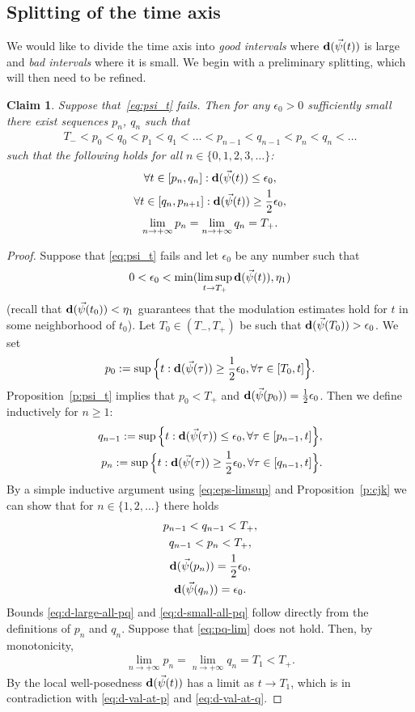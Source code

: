 \documentclass[10pt,reqno]{amsart}
\newcommand{\EQ}[1]{\begin{equation}\begin{split} #1 \end{split}\end{equation}}
\numberwithin{equation}{section}
\newtheorem{claim}[thm]{Claim}
\theoremstyle{remark}
\newcommand{\0}{\emptyset}
\newcommand{\eps}{\epsilon}
\newcommand{\bfd}{{\bf d}}
\begin{document}
\subsection{Splitting of the time axis}
We would like to divide the time axis into \emph{good intervals} where $\bfd(\vec\psi(t))$ is large
and \emph{bad intervals} where it is small.
We begin with a preliminary splitting, which will then need to be refined.
\begin{claim}\label{cl:pre-split}
Suppose that~\eqref{eq:psi_t} fails. Then for any $\eps_0 > 0$ sufficiently small there exist
sequences $p_n$, $q_n$ such that
\EQ{
T_- < p_0 < q_0 < p_1 < q_1 < \dots < p_{n-1} < q_{n-1} < p_n < q_n < \dots 
}
such that the following holds for all $n \in \{0, 1, 2, 3, \ldots\}$:
\begin{gather}
\forall t \in [p_n, q_n]: \bfd(\vec\psi(t)) \leq \eps_0, \label{eq:d-small-all-pq} \\
\forall t \in [q_n, p_{n+1}]: \bfd(\vec\psi(t)) \geq \frac 12\eps_0, \label{eq:d-large-all-pq} \\
\lim_{n \to +\infty}p_n = \lim_{n\to+\infty}q_n = T_+. \label{eq:pq-lim}
\end{gather}
\end{claim}
\begin{proof}
Suppose that \eqref{eq:psi_t} fails and let $\eps_0$ be any number such that
\EQ{\label{eq:eps-limsup}
0 < \eps_0 < \min(\limsup_{t\to T_+}\bfd(\vec\psi(t)), \eta_1)
}
(recall that $\bfd(\vec\psi(t_0)) < \eta_1$ guarantees that the modulation
estimates hold for $t$ in some neighborhood of $t_0$).
Let $T_0 \in (T_-, T_+)$ be such that $\bfd(\vec\psi(T_0)) > \eps_0$.
We set
\EQ{
p_0 := \sup\Big\{t: \bfd(\vec\psi(\tau)) \geq \frac 12 \eps_0, \forall \tau\in[T_0, t]\Big\}.
}
Proposition~\ref{p:psi_t} implies that $p_0 < T_+$ and $\bfd(\vec\psi(p_0)) = \frac 12 \eps_0$.
Then we define inductively for $n \geq 1$:
\begin{align}
q_{n-1} := \sup\Big\{t: \bfd(\vec\psi(\tau)) \leq \eps_0, \forall \tau\in[p_{n-1}, t]\Big\}, \\
p_n := \sup\Big\{t: \bfd(\vec\psi(\tau)) \geq \frac 12 \eps_0, \forall \tau\in[q_{n-1}, t]\Big\}.
\end{align}
By a simple inductive argument using \eqref{eq:eps-limsup} and Proposition~\ref{p:cjk}
we can show that for $n \in \{1, 2, \ldots\}$ there holds
\begin{gather}
p_{n-1} < q_{n-1} < T_+, \\
q_{n-1} < p_n < T_+, \\
\bfd(\vec\psi(p_n)) = \frac 12\eps_0, \label{eq:d-val-at-p} \\
\bfd(\vec\psi(q_n)) = \eps_0 \label{eq:d-val-at-q}.
\end{gather}
Bounds \eqref{eq:d-large-all-pq} and \eqref{eq:d-small-all-pq} follow directly from the definitions
of $p_n$ and $q_n$. Suppose that \eqref{eq:pq-lim} does not hold. Then, by monotonicity,
\EQ{
\lim_{n \to +\infty}p_n = \lim_{n\to+\infty}q_n = T_1 < T_+.
}
By the local well-posedness $\bfd(\vec\psi(t))$ has a limit as $t \to T_1$,
which is in contradiction with \eqref{eq:d-val-at-p} and \eqref{eq:d-val-at-q}.
\end{proof}
\end{document}
